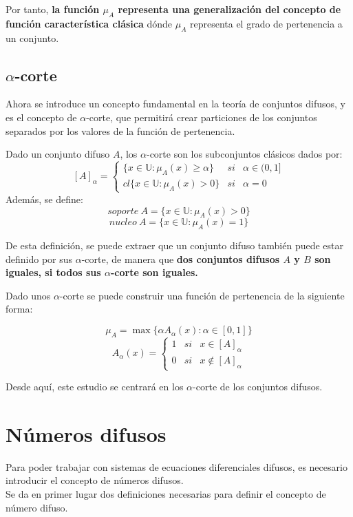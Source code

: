 Por tanto, \textbf{la función $\mu_A$ representa una generalización del concepto de función característica clásica} dónde $\mu_A$ representa el grado de pertenencia a un conjunto.

\subsection{$\alpha$-corte}
Ahora se introduce un concepto fundamental en la teoría de conjuntos difusos, y es el concepto de $\alpha$-corte, que permitirá crear particiones de los conjuntos separados por los valores de la función de pertenencia.
\begin{definicion}
  \label{def:alpha_corte}
  Dado un conjunto difuso $A$, los $\alpha$-corte son los subconjuntos clásicos dados por:
  \[
    [A]_\alpha = \left\{
    \begin{array}{ccc}
      \{x \in \mathbb{U} : \mu_A(x) \geq \alpha \} & si & \alpha \in (0, 1] \\
	cl\{x \in \mathbb{U} : \mu_A(x) > 0\} & si & \alpha=0
    \end{array}
    \right.
    \]
    Además, se define:
    \[
    soporte ~ A = \{x \in \mathbb{U} : \mu_A(x) > 0 \}
    \]
    \[
    nucleo ~ A = \{x \in \mathbb{U} : \mu_A(x) = 1 \}
    \]
\end{definicion}
De esta definición, se puede extraer que un conjunto difuso también puede estar definido por sus $\alpha$-corte, de manera que \textbf{dos conjuntos difusos $A$ y $B$ son iguales, si todos sus $\alpha$-corte son iguales.} 

Dado unos $\alpha$-corte se puede construir una función de pertenencia de la siguiente forma: \cite{apuntesfuzzy}

\[
\mu_A = \max{\{\alpha A_\alpha(x) : \alpha \in [0, 1]}\}
\]
\[
A_\alpha(x) = \left\{
\begin{array}{ccc}
  1 & si & x \in [A]_\alpha \\
  0 & si & x \notin [A]_\alpha
\end{array}
\right.
\]

Desde aquí, este estudio se centrará en los $\alpha$-corte de los conjuntos difusos.

\section{Números difusos}
Para poder trabajar con sistemas de ecuaciones diferenciales difusos, es necesario introducir el concepto de números difusos. \\
Se da en primer lugar dos definiciones necesarias para definir el concepto de número difuso.

